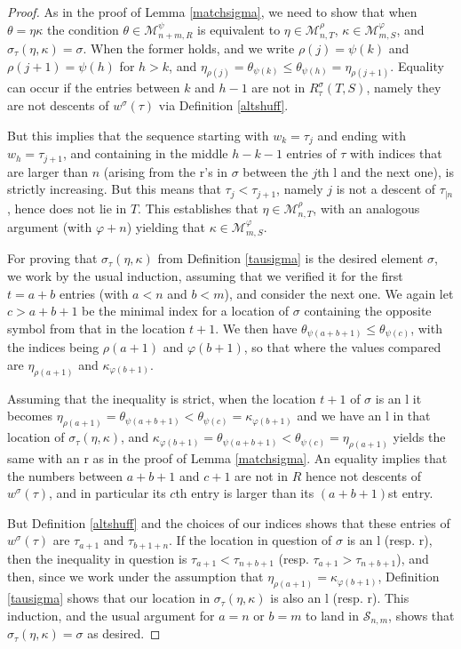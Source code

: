 \documentclass{article}
\theoremstyle{definition}
\begin{document}
\begin{proof}
As in the proof of Lemma \ref{matchsigma}, we need to show that when $\theta=\eta\kappa$ the condition $\theta\in\mathcal{M}_{n+m,R}^{\psi}$ is equivalent to $\eta\in\mathcal{M}_{n,T}^{\rho}$, $\kappa\in\mathcal{M}_{m,S}^{\varphi}$, and $\sigma_{\tau}(\eta,\kappa)=\sigma$. When the former holds, and we write $\rho(j)=\psi(k)$ and $\rho(j+1)=\psi(h)$ for $h>k$, and $\eta_{\rho(j)}=\theta_{\psi(k)}\leq\theta_{\psi(h)}=\eta_{\rho(j+1)}$. Equality can occur if the entries between $k$ and $h-1$ are not in $R^{\sigma}_{\tau}(T,S)$, namely they are not descents of $w^{\sigma}(\tau)$ via Definition \ref{altshuff}.

But this implies that the sequence starting with $w_{k}=\tau_{j}$ and ending with $w_{h}=\tau_{j+1}$, and containing in the middle $h-k-1$ entries of $\tau$ with indices that are larger than $n$ (arising from the r's in $\sigma$ between the $j$th l and the next one), is strictly increasing. But this means that $\tau_{j}<\tau_{j+1}$, namely $j$ is not a descent of $\tau_{|n}$, hence does not lie in $T$. This establishes that $\eta\in\mathcal{M}_{n,T}^{\rho}$, with an analogous argument (with $\varphi+n$) yielding that $\kappa\in\mathcal{M}_{m,S}^{\varphi}$.

For proving that $\sigma_{\tau}(\eta,\kappa)$ from Definition \ref{tausigma} is the desired element $\sigma$, we work by the usual induction, assuming that we verified it for the first $t=a+b$ entries (with $a<n$ and $b<m$), and consider the next one. We again let $c>a+b+1$ be the minimal index for a location of $\sigma$ containing the opposite symbol from that in the location $t+1$. We then have $\theta_{\psi(a+b+1)}\leq\theta_{\psi(c)}$, with the indices being $\rho(a+1)$ and $\varphi(b+1)$, so that where the values compared are $\eta_{\rho(a+1)}$ and $\kappa_{\varphi(b+1)}$.

Assuming that the inequality is strict, when the location $t+1$ of $\sigma$ is an l it becomes $\eta_{\rho(a+1)}=\theta_{\psi(a+b+1)}<\theta_{\psi(c)}=\kappa_{\varphi(b+1)}$ and we have an l in that location of $\sigma_{\tau}(\eta,\kappa)$, and $\kappa_{\varphi(b+1)}=\theta_{\psi(a+b+1)}<\theta_{\psi(c)}=\eta_{\rho(a+1)}$ yields the same with an r as in the proof of Lemma \ref{matchsigma}. An equality implies that the numbers between $a+b+1$ and $c+1$ are not in $R$ hence not descents of $w^{\sigma}(\tau)$, and in particular its $c$th entry is larger than its $(a+b+1)$st entry.

But Definition \ref{altshuff} and the choices of our indices shows that these entries of $w^{\sigma}(\tau)$ are $\tau_{a+1}$ and $\tau_{b+1+n}$. If the location in question of $\sigma$ is an l (resp. r), then the inequality in question is $\tau_{a+1}<\tau_{n+b+1}$ (resp. $\tau_{a+1}>\tau_{n+b+1}$), and then, since we work under the assumption that $\eta_{\rho(a+1)}=\kappa_{\varphi(b+1)}$, Definition \ref{tausigma} shows that our location in $\sigma_{\tau}(\eta,\kappa)$ is also an l (resp. r). This induction, and the usual argument for $a=n$ or $b=m$ to land in $\mathcal{S}_{n,m}$, shows that $\sigma_{\tau}(\eta,\kappa)=\sigma$ as desired.


\end{proof}
\end{document}
